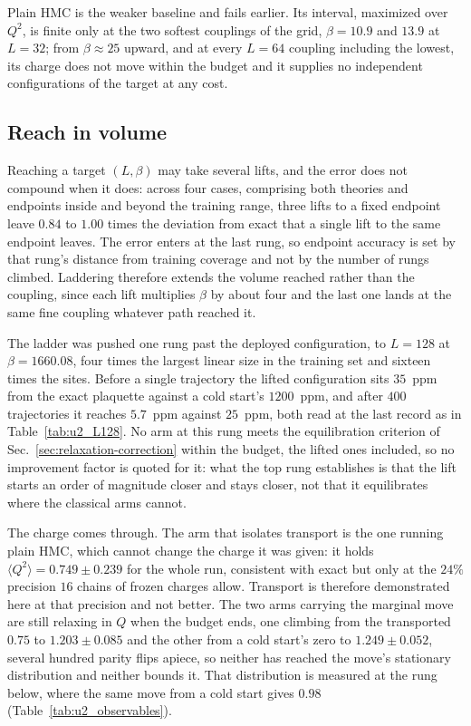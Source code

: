 \documentclass[prd, twocolumn, superscriptaddress, nofootinbib,floatfix]{revtex4-2}
\DeclareRobustCommand{\sect}[1]{Sec.~\ref{sec:#1}}
\DeclareRobustCommand{\tb}[1]{Table~\ref{tab:#1}}
\begin{document}
Plain HMC is the weaker baseline and fails earlier. Its interval, maximized over
$Q^2$, is finite only at the two softest couplings of the grid, $\beta=10.9$ and
$13.9$ at $L=32$; from $\beta\approx25$ upward, and at every $L=64$ coupling
including the lowest, its charge does not move within the budget and it supplies
no independent configurations of the target at any cost.


\subsection{Reach in volume}
\label{sec:multi-lift}

Reaching a target $(L,\beta)$ may take several lifts, and the error does not
compound when it does: across four cases, comprising both theories and
endpoints inside and beyond the training range, three lifts to a fixed endpoint
leave $0.84$ to $1.00$ times the deviation from exact that a single lift to the
same endpoint leaves. The error enters at the last rung, so endpoint accuracy is
set by that rung's distance from training coverage and not by the number of
rungs climbed. Laddering therefore extends the volume reached rather than the
coupling, since each lift multiplies $\beta$ by about four and the last one lands
at the same fine coupling whatever path reached it.

The ladder was pushed one rung past the deployed configuration, to $L=128$ at
$\beta=1660.08$, four times the largest linear size in the training set and
sixteen times the sites. Before a single trajectory the lifted configuration sits $35$~ppm from the
exact plaquette against a cold start's $1200$~ppm, and after $400$ trajectories
it reaches $5.7$~ppm against $25$~ppm, both read at the last record as in
\tb{u2_L128}. No arm at this rung meets the
equilibration criterion of \sect{relaxation-correction} within the budget,
the lifted ones included, so no improvement factor is quoted for it: what the
top rung establishes is that the lift starts an order of magnitude closer and
stays closer, not that it equilibrates where the classical arms cannot.

The charge comes through. The arm that isolates transport is the one running
plain HMC, which cannot change the charge it was given: it holds
$\langle Q^2\rangle=0.749\pm0.239$ for the whole run, consistent with exact but
only at the $24\%$ precision $16$ chains of frozen charges allow. Transport is
therefore demonstrated here at that precision and not better. The two arms
carrying the marginal move are still relaxing in $Q$ when the budget ends, one
climbing from the transported $0.75$ to $1.203\pm0.085$ and the other from a
cold start's zero to $1.249\pm0.052$, several hundred parity flips apiece, so
neither has reached the move's stationary distribution and neither bounds it.
That distribution is measured at the rung below, where the same move from a cold
start gives $0.98$ (\tb{u2_observables}).
\end{document}
